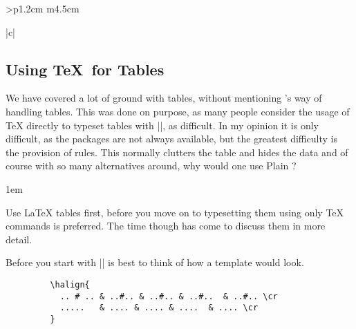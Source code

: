 \begin{tabular}{>{\bfseries}p{1.2cm} m{4.5cm}}
\begin{tabular}[t]{|c|}
\begin{longtable}
\clearpage

\section{Using \TeX\ for Tables}
  
We have covered a lot of ground with \latex tables, without mentioning \tex's way of handling tables. This was done on purpose, as many people consider the usage of TeX directly to typeset tables with |\halign|, as difficult. In my opinion it is only difficult, as the packages are not always available, but the greatest difficulty is the provision of rules. This normally clutters the table and hides the data and of course with so many alternatives around, why would one use Plain \tex?

\parindent1em

Use LaTeX tables first, before you move on to typesetting them using only TeX commands is preferred. The time though has come to discuss them in more detail.

Before you start with |\halign| is best to think of how a template would look. 

\begin{verbatim}
\end{verbatim}


\end{longtable}
\end{tabular}
\end{tabular}
